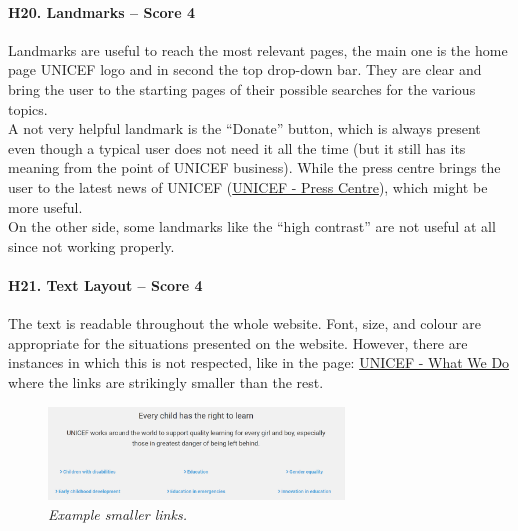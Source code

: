 \paragraph*{H20. Landmarks – Score 4}
Landmarks are useful to reach the most relevant pages, the main one is the home page UNICEF logo and in second the top drop-down bar. They are clear and bring the user to the starting pages of their possible searches for the various topics.\\
A not very helpful landmark is the “Donate” button, which is always present even though a typical user does not need it all the time (but it still has its meaning from the point of UNICEF business). While the press centre brings the user to the latest news of UNICEF (\href{https://www.unicef.org/media/press-centre}{UNICEF - Press Centre}), which might be more useful.\\
On the other side, some landmarks like the “high contrast” are not useful at all since not working properly.

\paragraph*{H21. Text Layout – Score 4}
The text is readable throughout the whole website. Font, size, and colour are appropriate for the situations presented on the website.
However, there are instances in which this is not respected, like in the page: \href{https://www.unicef.org/what-we-do}{UNICEF - What We Do} where the links are strikingly smaller than the rest.
\begin{figure}[h]
	\centering
	\begin{center}
		\includegraphics[width=0.7\textwidth]{Picture21.png}
	\end{center}
	\captionsetup{font=small}
	\caption{\textit{Example smaller links.}}
	\label{fig:label21}
\end{figure}


